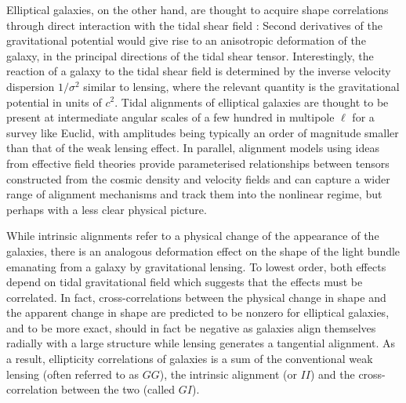 \documentclass[a4paper,fleqn,usenatbib]{mnras}
\begin{document}
Elliptical galaxies, on the other hand, are thought to acquire shape correlations through direct interaction with the tidal shear field \citep{blazek_beyond_2017, bate_when_2019}: Second derivatives of the gravitational potential would give rise to an anisotropic deformation of the galaxy, in the principal directions of the tidal shear tensor. Interestingly, the reaction of a galaxy to the tidal shear field is determined by the inverse velocity dispersion $1/\sigma^2$ similar to lensing, where the relevant quantity is the gravitational potential in units of $c^2$. Tidal alignments of elliptical galaxies are thought to be present at intermediate angular scales of a few hundred in multipole $\ell$ for a survey like Euclid, with amplitudes being typically an order of magnitude smaller than that of the weak lensing effect. In parallel, alignment models using ideas from effective field theories provide parameterised relationships between tensors constructed from the cosmic density and velocity fields and can capture a wider range of alignment mechanisms and track them into the nonlinear regime, but perhaps with a less clear physical picture. 

While intrinsic alignments refer to a physical change of the appearance of the galaxies, there is an analogous deformation effect on the shape of the light bundle emanating from a galaxy by gravitational lensing. To lowest order, both effects depend on tidal gravitational field which suggests that the effects must be correlated. In fact, cross-correlations between the physical change in shape and the apparent change in shape are predicted to be nonzero for elliptical galaxies, and to be more exact, should in fact be negative as galaxies align themselves radially with a large structure while lensing generates a tangential alignment. As a result, ellipticity correlations of galaxies is a sum of the conventional weak lensing (often referred to as $GG$), the intrinsic alignment (or $II$) and the cross-correlation between the two (called $GI$).
\end{document}
